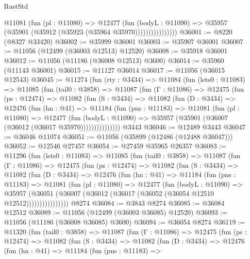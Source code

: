 \begin{lexlean}{RustStd}
\begin{coremodule}
                      @11081
                        (fun (pl : @11080) =>
                        @12477
                          (fun (bodyL : @11090) =>
                          @35957 (@35901 (@35912 (@35923 (@35964 @35970))))))))))))))))
@36001 := @8220 (@8327 @33420)
@36002 := @35999 @36001
@36003 := @35907 @36001
@36007 := @11056 (@12499 (@36003 @12513) @12520)
@36008 := @35918 @36001
@36012 := @11056 (@11186 (@36008 @12513) @3600)
@36014 := @35960 (@11143 @36001)
@36015 := @11127 @36014
@36017 := @11056 (@36015 @12543)
@36045 := @11274
    (fun (rty : @3434) =>
    @11084
      (fun (lets0 : @11083) =>
      @11085
        (fun (tail0 : @3858) =>
        @11087
          (fun (Γ : @11086) =>
          @12475
            (fun (ps : @12474) =>
            @11082
              (fun (S : @3434) =>
              @11082
                (fun (D : @3434) =>
                @12476
                  (fun (hn : @41) =>
                  @11184
                    (fun (pns : @11183) =>
                    @11081
                      (fun (pl : @11080) =>
                      @12477
                        (fun (bodyL : @11090) =>
                        @35957 (@35901 (@36007 (@36012 (@36017 @35970)))))))))))))))
    @3443
@36046 := @12489 @3443
@36047 := @36046 @11074
@36051 := @11056 (@35899 (@12486 (@12488 @36047)))
@36052 := @12546 @27457
@36054 := @27459 @35965 @26357
@36083 := @11296
    (fun (lets0 : @11083) =>
    @11085
      (fun (tail0 : @3858) =>
      @11087
        (fun (Γ : @11086) =>
        @12475
          (fun (ps : @12474) =>
          @11082
            (fun (S : @3434) =>
            @11082
              (fun (D : @3434) =>
              @12476
                (fun (hn : @41) =>
                @11184
                  (fun (pns : @11183) =>
                  @11081
                    (fun (pl : @11080) =>
                    @12477
                      (fun (bodyL : @11090) =>
                      @35957
                        (@36051
                          (@36007 (@36012 (@36017 (@36052 (@36054 @12510 @12512))))))))))))))))
    @8274
@36084 := @3843 @8274
@36085 := @36084 @12512
@36089 := @11056 (@12499 (@36003 @36085) @12520)
@36093 := @11056 (@11186 (@36008 @36085) @3600)
@36094 := @36054 @8274
@36119 := @11320
    (fun (tail0 : @3858) =>
    @11087
      (fun (Γ : @11086) =>
      @12475
        (fun (ps : @12474) =>
        @11082
          (fun (S : @3434) =>
          @11082
            (fun (D : @3434) =>
            @12476
              (fun (hn : @41) =>
              @11184
                (fun (pns : @11183) =>

\end{coremodule}
\end{lexlean}
